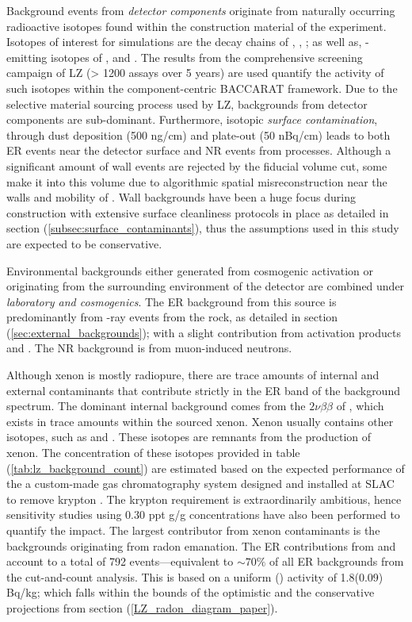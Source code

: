 Background events from \textit{detector components} originate from naturally occurring radioactive isotopes found within the construction material of the experiment. Isotopes of interest for simulations are the decay chains of \UTTE{}, \UTTF{}, \ThTTT{}; as well as, \gamma-emitting isotopes of \KFZ{}, \CsOTS{} and \CoSZ{}. The results from the comprehensive screening campaign of LZ (> 1200 assays over 5 years) are used quantify the activity of such isotopes within the component-centric BACCARAT framework. Due to the selective material sourcing process used by LZ, backgrounds from detector components are sub-dominant. Furthermore, isotopic \textit{surface contamination}, through dust deposition (500 ng/cm\squared{}) and \RnTTT{} plate-out (50 nBq/cm\squared) leads to both ER events near the detector surface and NR events from \alphaN{} processes. Although a significant amount of wall events are rejected by the fiducial volume cut, some make it into this volume due to algorithmic spatial misreconstruction near the walls and mobility of \BiTOZ{}. Wall backgrounds have been a huge focus during construction with extensive surface cleanliness protocols in place as detailed in section (\ref{subsec:surface_contaminants}), thus the assumptions used in this study are expected to be conservative.

%

%

Environmental backgrounds either generated from cosmogenic activation or originating from the surrounding environment of the detector are combined under \textit{laboratory and cosmogenics}. The ER background from this source is predominantly from \gamma-ray events from the rock, as detailed in section (\ref{sec:external_backgrounds}); with a slight contribution from activation products \XeOTS{} and \ScFS{}. The NR background is from muon-induced neutrons. 

Although xenon is mostly radiopure, there are trace amounts of internal and external contaminants that contribute strictly in the ER band of the background spectrum. The dominant internal background comes from the $2\nu\beta\beta$ of \XeOTS{}, which exists in trace amounts within the sourced xenon. Xenon usually contains other isotopes, such as \KrEF{} and \ArTN{}. These isotopes are remnants from the production of xenon. The concentration of these isotopes provided in table (\ref{tab:lz_background_count}) are estimated based on the expected performance of the a custom-made gas chromatography system designed and installed at SLAC to remove krypton \cite{lz_tdr}. The krypton requirement is extraordinarily ambitious, hence sensitivity studies using 0.30 ppt g/g concentrations have also been performed to quantify the impact. The largest contributor from xenon contaminants is the backgrounds originating from radon emanation. The ER contributions from \RnTTT{} and \RnTTZ{} account to a total of 792 events---equivalent to $\sim70\%$ of all ER backgrounds from the cut-and-count analysis. This is based on a uniform \RnTTT{}(\RnTTZ{}) activity of 1.8(0.09) \micro{}Bq/kg; which falls within the bounds of the optimistic and the conservative projections from section (\ref{LZ_radon_diagram_paper}).

